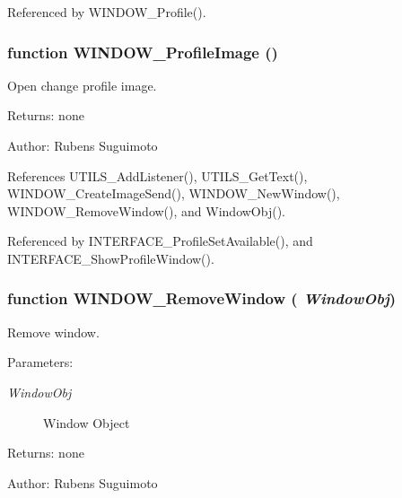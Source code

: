 Referenced by WINDOW\_\-Profile().
\subsubsection[WINDOW\_\-ProfileImage]{\setlength{\rightskip}{0pt plus 5cm}function WINDOW\_\-ProfileImage ()}\label{window_2window_8js_1c42b15fa0a4e852e46304ee51b506a8}


Open change profile image. 

\begin{Desc}
\item[Returns:]none \end{Desc}
\begin{Desc}
\item[Author:]Rubens Suguimoto \end{Desc}


References UTILS\_\-AddListener(), UTILS\_\-GetText(), WINDOW\_\-CreateImageSend(), WINDOW\_\-NewWindow(), WINDOW\_\-RemoveWindow(), and WindowObj().

Referenced by INTERFACE\_\-ProfileSetAvailable(), and INTERFACE\_\-ShowProfileWindow().
\subsubsection[WINDOW\_\-RemoveWindow]{\setlength{\rightskip}{0pt plus 5cm}function WINDOW\_\-RemoveWindow ( {\em WindowObj})}\label{window_2window_8js_f8f27008b4a8fe544068dc7db513ce47}


Remove window. 

\begin{Desc}
\item[Parameters:]
\begin{description}
\item[{\em WindowObj}]Window Object \end{description}
\end{Desc}
\begin{Desc}
\item[Returns:]none \end{Desc}
\begin{Desc}
\item[Author:]Rubens Suguimoto \end{Desc}


